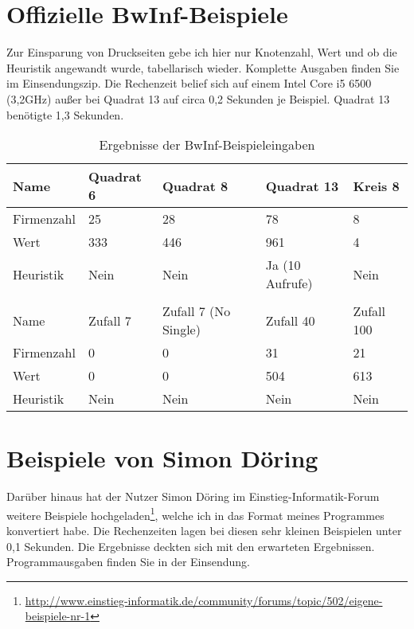 \section {Offizielle BwInf-Beispiele}
Zur Einsparung von Druckseiten gebe ich hier nur Knotenzahl, Wert und ob die Heuristik angewandt wurde, tabellarisch wieder. Komplette Ausgaben finden Sie im Einsendungszip. Die Rechenzeit belief sich auf einem Intel Core i5 6500 (3,2GHz) außer bei Quadrat 13 auf circa 0,2 Sekunden je Beispiel. Quadrat 13 benötigte 1,3 Sekunden.

\begin{table}[!h]
	\centering
    \begin{tabular}{lllll}
    Name       & Quadrat 6 	& Quadrat 8 				& Quadrat 13      	& Kreis 8		\\ \hline
    Firmenzahl & 25        	& 28        				& 78              	& 8      		\\
    Wert       & 333       	& 446       				& 961             	& 4      		\\
    Heuristik  & Nein      	& Nein      				& Ja (10 Aufrufe) 	& Nein  		\\ \\
    Name       & Zufall 7 	& Zufall 7 (No Single) 		& Zufall 40 		& Zufall 100 	\\ \hline
    Firmenzahl & 0       	& 0                    		& 31        		& 21        	\\
    Wert       & 0        	& 0                    		& 504       		& 613        	\\
    Heuristik  & Nein     	& Nein                 		& Nein      		& Nein      	\\
    \end{tabular}
    \caption{Ergebnisse der BwInf-Beispieleingaben}
\end{table}

\section {Beispiele von Simon Döring}
Darüber hinaus hat der Nutzer Simon Döring im Einstieg-Informatik-Forum weitere Beispiele hochgeladen\footnote{\url{http://www.einstieg-informatik.de/community/forums/topic/502/eigene-beispiele-nr-1}}, welche ich in das Format meines Programmes konvertiert habe. Die Rechenzeiten lagen bei diesen sehr kleinen Beispielen unter 0,1 Sekunden. Die Ergebnisse deckten sich mit den erwarteten Ergebnissen. Programmausgaben finden Sie in der Einsendung.

